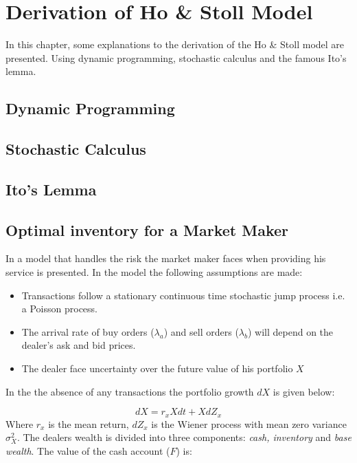 \documentclass{kththesis}
\theoremstyle{definition}
\begin{document}
\chapter{Derivation of Ho \& Stoll Model}\label{app:B}
In this chapter, some explanations to the derivation of the Ho \& Stoll model are presented. Using dynamic programming, stochastic calculus and the famous Ito's lemma.

\section{Dynamic Programming}

\section{Stochastic Calculus}

\section{Ito's Lemma}

\section{Optimal inventory for a Market Maker}
In \textcite{ho1981optimal} a model that handles the risk the market maker faces when providing his service is presented. In the model the following assumptions are made:

\begin{itemize}
    \item Transactions follow a stationary continuous time stochastic jump process i.e. a Poisson process. 
    
    \item The arrival rate of buy orders ($\lambda_a$) and sell orders ($\lambda_b$) will depend on the dealer's ask and bid prices.
    
    \item The dealer face uncertainty over the future value of his portfolio $X$
\end{itemize}
In the the absence of any transactions the portfolio growth $dX$ is given below:

\begin{equation}
    \label{eq:a8}
    dX = r_{x}Xdt + XdZ_x
\end{equation}
Where $r_x$ is the mean return, $dZ_x$ is the Wiener process with mean zero variance $\sigma^{2}_X$. The dealers wealth is divided into three components: \textit{cash, inventory} and \textit{base wealth}. The value of the cash account ($F$) is:
\end{document}
